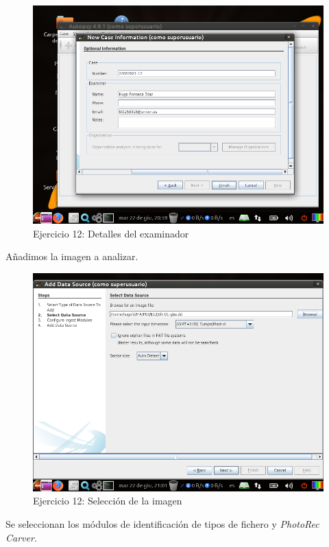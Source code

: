 \documentclass[11pt]{article}
\begin{document}
\begin{figure}[H]
    \caption{Ejercicio 12: Detalles del examinador}
    \centering
    \includegraphics[scale=0.7]{e12-2.png}
\end{figure}

Añadimos la imagen a analizar.

\begin{figure}[H]
    \caption{Ejercicio 12: Selección de la imagen}
    \centering
    \includegraphics[scale=0.7]{e12-3.png}
\end{figure}

Se seleccionan los módulos de identificación de tipos de fichero y \textit{PhotoRec Carver}.
\end{document}
